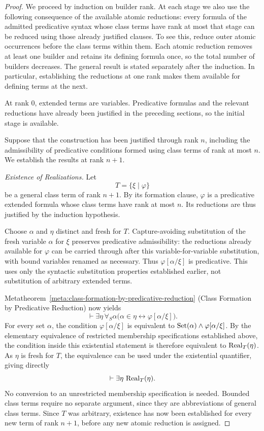 \begin{proof}
We proceed by induction on builder rank. At each stage we also use
the following consequence of the available atomic reductions: every
formula of the admitted predicative syntax whose class terms have
rank at most that stage can be reduced using those already justified
clauses. To see this, reduce outer atomic occurrences before the
class terms within them. Each atomic reduction removes at least one
builder and retains its defining formula once, so the total number
of builders decreases. The general result is stated separately after
the induction. In particular, establishing the reductions at one
rank makes them available for defining terms at the next.

At rank \(0\), extended terms are variables. Predicative formulas
and the relevant reductions have already been justified in the
preceding sections, so the initial stage is available.

Suppose that the construction has been justified through rank \(n\),
including the admissibility of predicative conditions formed using
class terms of rank at most \(n\). We establish the results at rank
\(n+1\).

\medskip
\noindent\emph{Existence of Realizations.}
Let
\[
T=\{\xi\mid\varphi\}
\]
be a general class term of rank \(n+1\). By its formation clause,
\(\varphi\) is a predicative extended formula whose class terms have
rank at most \(n\). Its reductions are thus justified by the
induction hypothesis.

Choose \(\alpha\) and \(\eta\) distinct and fresh for \(T\).
Capture-avoiding substitution of the fresh variable \(\alpha\) for
\(\xi\) preserves predicative admissibility: the reductions already
available for \(\varphi\) can be carried through after this
variable-for-variable substitution, with bound variables renamed as
necessary. Thus \(\varphi[\alpha/\xi]\) is predicative. This uses
only the syntactic substitution properties established earlier, not
substitution of arbitrary extended terms.

Metatheorem~\ref{meta:class-formation-by-predicative-reduction}
(Class Formation by Predicative Reduction) now yields
\[
\vdash\exists\eta\,\forall_S\alpha
\bigl(\alpha\in\eta\leftrightarrow
\varphi[\alpha/\xi]\bigr).
\]
For every set \(\alpha\), the condition
\(\varphi[\alpha/\xi]\) is equivalent to
\(\operatorname{Set}(\alpha)\land\varphi[\alpha/\xi]\). By the elementary
equivalence of restricted membership specifications established
above, the condition inside this existential statement is
therefore equivalent to \(\operatorname{Real}_T(\eta)\). As \(\eta\) is
fresh for \(T\), the equivalence can be used under the
existential quantifier, giving directly
\[
\vdash\exists\eta\,\operatorname{Real}_T(\eta).
\]
No conversion to an unrestricted membership specification is needed.
Bounded class terms require no separate argument, since they are
abbreviations of general class terms. Since \(T\) was arbitrary,
existence has now been established for every new term of rank
\(n+1\), before any new atomic reduction is assigned.


\end{proof}
